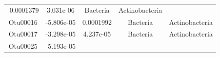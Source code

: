 \documentclass[]{article}
\begin{document}
\begin{longtable}[]{@{}ccccc@{}}
\begin{minipage}[t]{0.16\columnwidth}
-0.0001379\strut
\end{minipage} & \begin{minipage}[t]{0.14\columnwidth}\centering\strut
3.031e-06\strut
\end{minipage} & \begin{minipage}[t]{0.13\columnwidth}\centering\strut
Bacteria\strut
\end{minipage} & \begin{minipage}[t]{0.27\columnwidth}\centering\strut
Actinobacteria\strut
\end{minipage}\tabularnewline
\begin{minipage}[t]{0.13\columnwidth}\centering\strut
Otu00016\strut
\end{minipage} & \begin{minipage}[t]{0.16\columnwidth}\centering\strut
-5.806e-05\strut
\end{minipage} & \begin{minipage}[t]{0.14\columnwidth}\centering\strut
0.0001992\strut
\end{minipage} & \begin{minipage}[t]{0.13\columnwidth}\centering\strut
Bacteria\strut
\end{minipage} & \begin{minipage}[t]{0.27\columnwidth}\centering\strut
Actinobacteria\strut
\end{minipage}\tabularnewline
\begin{minipage}[t]{0.13\columnwidth}\centering\strut
Otu00017\strut
\end{minipage} & \begin{minipage}[t]{0.16\columnwidth}\centering\strut
-3.298e-05\strut
\end{minipage} & \begin{minipage}[t]{0.14\columnwidth}\centering\strut
4.237e-05\strut
\end{minipage} & \begin{minipage}[t]{0.13\columnwidth}\centering\strut
Bacteria\strut
\end{minipage} & \begin{minipage}[t]{0.27\columnwidth}\centering\strut
Actinobacteria\strut
\end{minipage}\tabularnewline
\begin{minipage}[t]{0.13\columnwidth}\centering\strut
Otu00025\strut
\end{minipage} & \begin{minipage}[t]{0.16\columnwidth}\centering\strut
-5.193e-05\strut
\end{minipage} & \begin{minipage}[t]{0.14\columnwidth}\centering\strut

\end{minipage}
\end{longtable}
\end{document}

